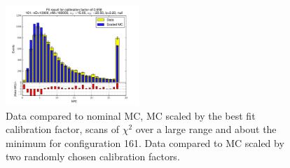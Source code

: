 \begin{figure}[htbp]
\begin{center}
\includegraphics[width=0.45\textwidth]{../FIGURES/161/FIG_Fit_result_for_calibration_factor_of_0_658.pdf} 
\caption{Data compared to nominal MC, MC scaled by the best fit calibration factor, scans of $\chi^2$ over a large range and about the minimum for configuration 161. Data compared to MC scaled by two randomly chosen calibration factors.} 
\label{tab:best_161} 
\end{center} \end{figure} 

